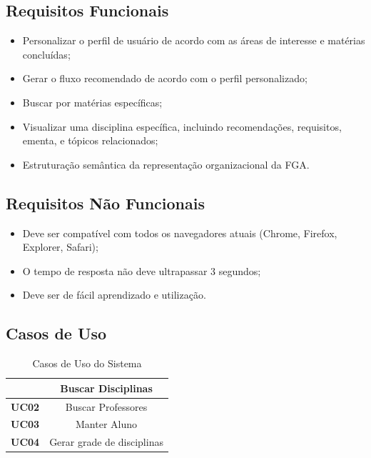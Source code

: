 
\subsection{Requisitos Funcionais} %
\label{sub:requisitos_funcionais}
	\begin{itemize}
		\item Personalizar o perfil de usuário de acordo com as áreas de interesse e matérias concluídas;
		\item Gerar o fluxo recomendado de acordo com o perfil personalizado;
		\item Buscar por matérias específicas;
		\item Visualizar uma disciplina específica, incluindo recomendações, requisitos, ementa, e tópicos relacionados;
		\item Estruturação semântica da representação organizacional da FGA.
	\end{itemize}


\subsection{Requisitos Não Funcionais} %
\label{sub:requisitos_n_o_funcionais}
	\begin{itemize}
		\item Deve ser compatível com todos os navegadores atuais (Chrome, Firefox, Explorer, Safari);
		\item O tempo de resposta não deve ultrapassar 3 segundos;
		\item Deve ser de fácil aprendizado e utilização.
	\end{itemize}

\subsection{Casos de Uso} %
\label{sub:casos_de_uso}

\begin{table}[H]
\centering
	\begin{tabular}{|c|c|}
		\hline
		\cellcolor[HTML]{FFFFFF}{\color[HTML]{000000} \textbf{UC01}} & Buscar Disciplinas         \\ \hline
		\textbf{UC02}                                                & Buscar Professores         \\ \hline
		\textbf{UC03}                                                & Manter Aluno               \\ \hline
		\textbf{UC04}                                                & Gerar grade de disciplinas \\ \hline
	\end{tabular}
	\caption{Casos de Uso do Sistema}
	\label{tab:casosDeUso}
\end{table}

